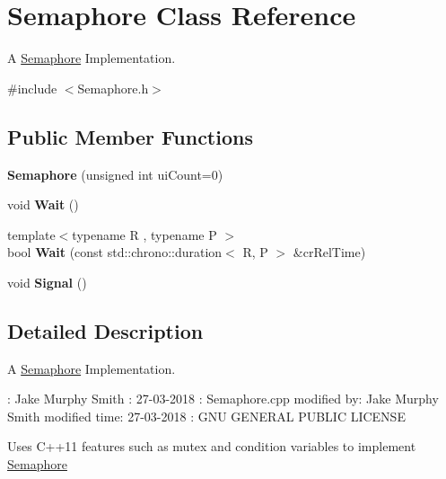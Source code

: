 \hypertarget{class_semaphore}{}\section{Semaphore Class Reference}
\label{class_semaphore}


A \hyperlink{class_semaphore}{Semaphore} Implementation.  




{\ttfamily \#include $<$Semaphore.\+h$>$}

\subsection*{Public Member Functions}
\begin{DoxyCompactItemize}
\item 
{\bfseries Semaphore} (unsigned int ui\+Count=0)\hypertarget{class_semaphore_a0d9290d316636875ca85d1d78950a817}{}\label{class_semaphore_a0d9290d316636875ca85d1d78950a817}

\item 
void {\bfseries Wait} ()\hypertarget{class_semaphore_a72aabebf026e3a8b1f3e4d0fa8ee1eda}{}\label{class_semaphore_a72aabebf026e3a8b1f3e4d0fa8ee1eda}

\item 
{\footnotesize template$<$typename R , typename P $>$ }\\bool {\bfseries Wait} (const std\+::chrono\+::duration$<$ R, P $>$ \&cr\+Rel\+Time)\hypertarget{class_semaphore_a7f700173ae86ae623684109066e07656}{}\label{class_semaphore_a7f700173ae86ae623684109066e07656}

\item 
void {\bfseries Signal} ()\hypertarget{class_semaphore_a86f92f738b4486439b296d8e235895f2}{}\label{class_semaphore_a86f92f738b4486439b296d8e235895f2}

\end{DoxyCompactItemize}


\subsection{Detailed Description}
A \hyperlink{class_semaphore}{Semaphore} Implementation. 

\+: Jake Murphy Smith \+: 27-\/03-\/2018 \+: Semaphore.\+cpp  modified by\+: Jake Murphy Smith  modified time\+: 27-\/03-\/2018 \+: G\+NU G\+E\+N\+E\+R\+AL P\+U\+B\+L\+IC L\+I\+C\+E\+N\+SE

Uses C++11 features such as mutex and condition variables to implement \hyperlink{class_semaphore}{Semaphore}

